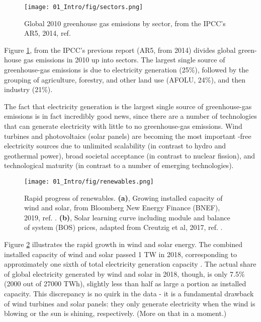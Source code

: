\begin{figure}[t]
	\centering
	\texttt{[image: 01\_Intro/fig/sectors.png]}
	\caption{Global 2010 greenhouse gas emissions by sector, from the IPCC's AR5, 2014, ref. \cite{IPCC2014}}
	\label{fig:sectors}
\end{figure}

Figure \ref{fig:sectors}, from the IPCC's previous report (AR5, from 2014)\cite{IPCC2014} divides global green-house gas emissions in 2010 up into sectors. The largest single source of greenhouse-gas emissions is due to electricity generation (25\%), followed by the grouping of agriculture, forestry, and other land use (AFOLU, 24\%), and then industry (21\%). 

The fact that electricity generation is the largest single source of greenhouse-gas emissions is in fact incredibly good news, since there are a number of technologies that can generate electricity with little to no greenhouse-gas emissions. Wind turbines and photovoltaics (solar panels) are becoming the most important -free electricity sources due to unlimited scalability (in contrast to hydro and geothermal power), broad societal acceptance (in contrast to nuclear fission), and technological maturity (in contrast to a number of emerging technologies)\cite{BNEF2018, Creutzig2017}. 
\begin{figure}[b!]
	\centering
	\texttt{[image: 01\_Intro/fig/renewables.png]}
	\caption{Rapid progress of renewables. \textbf{(a)}, Growing installed capacity of wind and solar, from Bloomberg New Energy Finance (BNEF), 2019, ref. . \textbf{(b)}, Solar learning curve including module and balance of system (BOS) prices, adapted from Creutzig et al, 2017, ref. .}
	\label{fig:renewables}
\end{figure}
Figure \ref{fig:renewables} illustrates the rapid growth in wind and solar energy. The combined installed capacity of wind and solar passed 1 TW\cite{BNEF2018} in 2018, corresponding to approximately one sixth of total electricity generation capacity \cite{IRENA2019}. The actual share of global electricity generated by wind and solar in 2018, though, is only 7.5\% (2000 out of 27000 TWh)\cite{Enerdata2019}, slightly less than half as large a portion as installed capacity. This discrepancy is no quirk in the data - it is a fundamental drawback of wind turbines and solar panels: they only generate electricity when the wind is blowing or the sun is shining, respectively. (More on that in a moment.)


